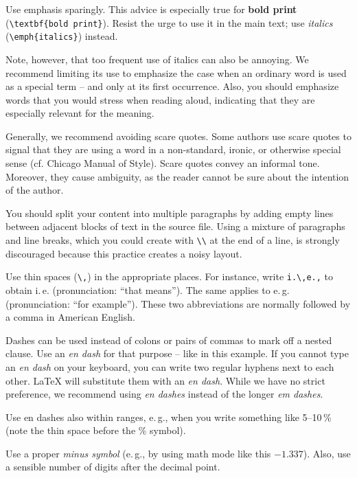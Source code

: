 Use emphasis sparingly. This advice is especially true for \textbf{bold print} (\verb|\textbf{bold print}|). Resist the urge to use it in the main text; use \emph{italics} (\verb|\emph{italics}|) instead.

Note, however, that too frequent use of italics can also be annoying.%
We recommend limiting its use to emphasize the case when an ordinary word is used as a special term – and only at its first occurrence. Also, you should emphasize words that you would stress when reading aloud, indicating that they are especially relevant for the meaning.


Generally, we recommend avoiding scare quotes.%
Some authors use scare quotes to signal that they are using a word in a non-standard, ironic, or otherwise special sense (cf. Chicago Manual of Style). Scare quotes convey an informal tone. Moreover, they cause ambiguity, as the reader cannot be sure about the intention of the author.

You should split your content into multiple paragraphs by adding empty lines between adjacent blocks of text in the source file. Using a mixture of paragraphs and line breaks, which you could create with \verb|\\| at the end of a line, is strongly discouraged because this practice creates a noisy layout.

Use thin spaces (\verb|\,|) in the appropriate places. For instance, write \verb|i.\,e.,| to obtain i.\,e. (pronunciation: ``that means''). The same applies to e.\,g. (pronunciation: ``for example''). These two abbreviations are normally followed by a comma in American English.

Dashes can be used instead of colons or pairs of commas to mark off a nested clause. Use an \emph{en dash} for that purpose -- like in this example. If you cannot type an \emph{en dash} on your keyboard, you can write two regular hyphens next to each other. LaTeX will substitute them with an \emph{en dash}. While we have no strict preference, we recommend using \emph{en dashes} instead of the longer \emph{em dashes}.

Use en dashes also within ranges, e.\,g., when you write something like 5--10\,\% (note the thin space before the \% symbol).

Use a proper \emph{minus symbol} (e.\,g., by using math mode like this \(-1.337\)). Also, use a sensible number of digits after the decimal point.

